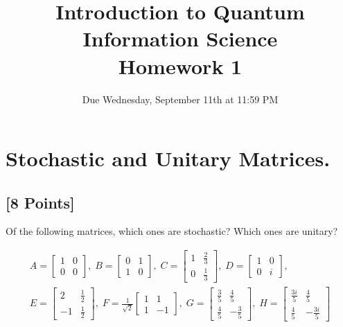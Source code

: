 \documentclass[11pt]{article}
\providecommand{\due}{Due Wednesday, September 11th at 11:59 PM}
\begin{document}
\title{Introduction to Quantum Information Science\\Homework 1}
\date{\due}

\maketitle

\section{Stochastic and Unitary Matrices.} 

\subsection{[8 Points]} Of the following matrices, which ones are stochastic? Which
ones are unitary?

\begin{gather*}
A =
\begin{bmatrix}
1 & 0\\
0 & 0
\end{bmatrix}\!,\;
B=
\begin{bmatrix}
0 & 1\\
1 & 0
\end{bmatrix}\!,\;
C=
\begin{bmatrix}
1 & \frac{2}{3}\\[0.1em]
0 & \frac{1}{3}
\end{bmatrix}\!,\;
D=
\begin{bmatrix}
1 & 0\\
0 & i
\end{bmatrix}\!,\\
E =
\begin{bmatrix}
2 & \frac{1}{2}\\[0.1em]
-1 & \frac{1}{2}
\end{bmatrix}\!,\;
F = \frac{1}{\sqrt{2}}
\begin{bmatrix}
1 & 1\\
1 & -1
\end{bmatrix}\!,\;
G=
\begin{bmatrix}
\frac{3}{5} & \frac{4}{5}\\[0.1em]
\frac{4}{5} & -\frac{3}{5}
\end{bmatrix}\!,\;
H=
\begin{bmatrix}
\frac{3i}{5} & \frac{4}{5}\\[0.1em]
\frac{4}{5} & -\frac{3i}{5}
\end{bmatrix}
\end{gather*}
\end{document}
